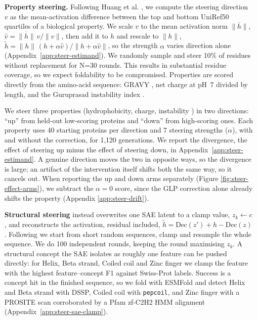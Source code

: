 \documentclass{article}
\begin{document}
\textbf{Property steering.} Following Huang et al. \cite{huang2025diffmean},
we compute the steering direction $v$ as the mean-activation difference between the top and bottom UniRef50
quartiles of a biological property.
We scale $v$ to the mean activation norm $\overline{\lVert h\rVert}$,
$\hat v = \overline{\lVert h\rVert}\,v/\lVert v\rVert$, then add it to $h$ and rescale to
$\lVert h\rVert$, $\tilde h = \lVert h\rVert\,(h + \alpha\hat v)/\lVert h + \alpha\hat v\rVert$,
so the strength $\alpha$ varies direction alone (Appendix~\ref{app:steer-estimand}). We randomly sample and steer 10\% of residues without replacement for N=30 rounds. This results in substantial residue coverage, so we expect foldability to be compromised. Properties are scored directly from the amino-acid sequence: GRAVY \cite{kyte1982gravy}, net charge at pH~7 divided by length,
and the Guruprasad instability index \cite{guruprasad1990instability}.

We steer three properties (hydrophobicity, charge, instability
\cite{banerjee2025labelling}) in two directions: ``up'' from held-out low-scoring proteins and
``down'' from high-scoring ones. Each property uses 40 starting proteins per direction and 7
steering strengths ($\alpha$), with and without the correction, for 1{,}120 generations. We report the divergence, the effect of steering up minus the effect of steering down, in Appendix~\ref{app:steer-estimand}.
A genuine direction moves the two in opposite ways, so the divergence is large; an artifact of
the intervention itself shifts both the same way, so it cancels out. When reporting the up and down arms separately (Figure \ref{fig:steer-effect-arms}), we subtract the $\alpha{=}0$ score, since
the GLP correction alone already shifts the property (Appendix \ref{app:steer-drift}).

\textbf{Structural steering} instead overwrites one SAE
latent to a clamp value, $z_k \!\leftarrow\! c$, and reconstructs the activation, residual included, $\tilde h = \mathrm{Dec}(z') + h - \mathrm{Dec}(z)$. Following
\cite{villegas2025plmsae} we start from short random sequences, clamp and resample the
whole sequence. We do 100 independent rounds, keeping the round maximising $z_k$. A structural concept the SAE isolates as
roughly one feature can be pushed directly: for Helix, Beta strand, Coiled coil and
Zinc finger we clamp the feature with the highest feature--concept F1 against
Swiss-Prot labels. Success is a concept hit in the finished sequence, so we fold with
ESMFold and detect Helix and Beta strand with DSSP, Coiled coil with
\texttt{pepcoil}, and Zinc finger with a PROSITE \cite{sigrist2026prosite} scan
corroborated by a Pfam zf-C2H2 HMM alignment \cite{sathyaseelan2023znfprot}  (Appendix~\ref{app:steer-sae-clamp}).
\end{document}

